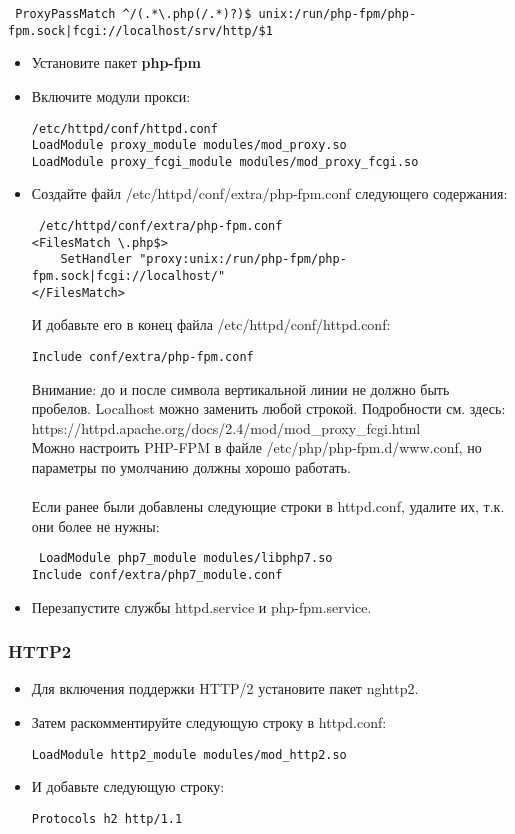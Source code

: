 \documentclass[a4paper,10pt,twoside]{article}
\begin{document}
\begin{verbatim}
 ProxyPassMatch ^/(.*\.php(/.*)?)$ unix:/run/php-fpm/php-fpm.sock|fcgi://localhost/srv/http/$1
\end{verbatim} 

\begin{itemize}
 \item Установите пакет \textbf{php-fpm}
\item Включите модули прокси:
\begin{verbatim}
/etc/httpd/conf/httpd.conf
LoadModule proxy_module modules/mod_proxy.so
LoadModule proxy_fcgi_module modules/mod_proxy_fcgi.so
\end{verbatim} 
\item Создайте файл /etc/httpd/conf/extra/php-fpm.conf следующего содержания:
\begin{verbatim}
 /etc/httpd/conf/extra/php-fpm.conf
<FilesMatch \.php$>
    SetHandler "proxy:unix:/run/php-fpm/php-fpm.sock|fcgi://localhost/"
</FilesMatch>
\end{verbatim}
И добавьте его в конец файла /etc/httpd/conf/httpd.conf:
\begin{verbatim}
Include conf/extra/php-fpm.conf
\end{verbatim} 
Внимание: до и после символа вертикальной линии не должно быть пробелов. Localhost можно заменить любой строкой. Подробности см. здесь: https://httpd.apache.org/docs/2.4/mod/mod\_proxy\_fcgi.html\\
Можно настроить PHP-FPM в файле /etc/php/php-fpm.d/www.conf, но параметры по умолчанию должны хорошо работать.\\ 
\\
Если ранее были добавлены следующие строки в httpd.conf, удалите их, т.к. они более не нужны:
\begin{verbatim}
 LoadModule php7_module modules/libphp7.so
Include conf/extra/php7_module.conf
\end{verbatim} 
\item Перезапустите службы httpd.service и php-fpm.service.
\end{itemize}



\subsubsection{HTTP2}
\begin{itemize}
 \item Для включения поддержки HTTP/2 установите пакет nghttp2.
\item Затем раскомментируйте следующую строку в httpd.conf:
\begin{verbatim}
LoadModule http2_module modules/mod_http2.so
\end{verbatim} 
\item И добавьте следующую строку:
\begin{verbatim}
Protocols h2 http/1.1
\end{verbatim} 
\end{itemize}
\end{document}
